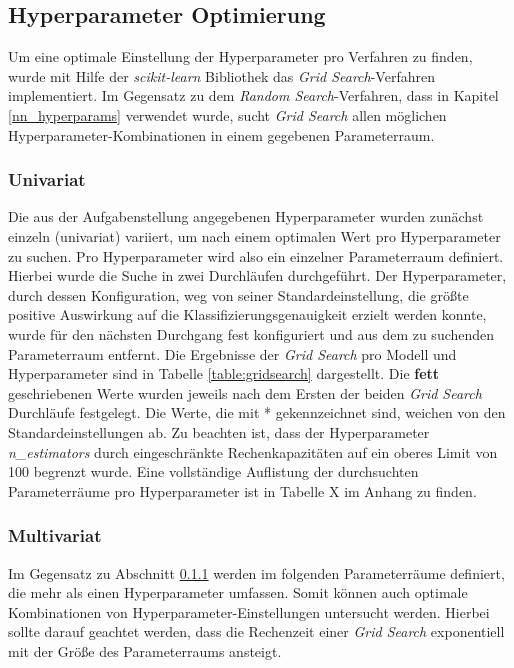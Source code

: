 \subsection{Hyperparameter Optimierung}
Um eine optimale Einstellung der Hyperparameter pro Verfahren zu finden, wurde mit Hilfe der \emph{scikit-learn} Bibliothek das \emph{Grid Search}-Verfahren implementiert. Im Gegensatz zu dem \emph{Random Search}-Verfahren, dass in Kapitel \ref{nn_hyperparams} verwendet wurde, sucht \emph{Grid Search} allen möglichen Hyperparameter-Kombinationen in einem gegebenen Parameterraum. 

\subsubsection{Univariat}
\label{section:univariat}
Die aus der Aufgabenstellung angegebenen Hyperparameter wurden zunächst einzeln (univariat) variiert, um nach einem optimalen Wert pro Hyperparameter zu suchen. Pro Hyperparameter wird also ein einzelner Parameterraum definiert. Hierbei wurde die Suche in zwei Durchläufen durchgeführt. Der Hyperparameter, durch dessen Konfiguration, weg von seiner Standardeinstellung, die größte positive Auswirkung auf die Klassifizierungsgenauigkeit erzielt werden konnte, wurde für den  nächsten Durchgang fest konfiguriert und aus dem zu suchenden Parameterraum entfernt. Die Ergebnisse der \emph{Grid Search} pro Modell und Hyperparameter sind in Tabelle \ref{table:gridsearch} dargestellt. Die \textbf{fett} geschriebenen Werte wurden jeweils nach dem Ersten der beiden \emph{Grid Search} Durchläufe festgelegt. Die Werte, die mit * gekennzeichnet sind, weichen von den Standardeinstellungen ab. Zu beachten ist, dass der Hyperparameter \emph{n\_estimators} durch eingeschränkte Rechenkapazitäten auf ein oberes Limit von 100 begrenzt wurde. Eine vollständige Auflistung der durchsuchten Parameterräume pro Hyperparameter ist in Tabelle X im Anhang zu finden.
 
\subsubsection{Multivariat}
Im Gegensatz zu Abschnitt \ref{section:univariat} werden im folgenden Parameterräume definiert, die mehr als einen Hyperparameter umfassen. Somit können auch optimale Kombinationen von Hyperparameter-Einstellungen untersucht werden. Hierbei sollte darauf geachtet werden, dass die Rechenzeit einer \emph{Grid Search} exponentiell mit der Größe des Parameterraums ansteigt.

